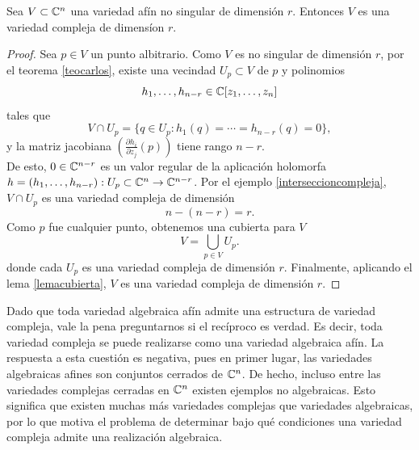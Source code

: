 \begin{corollary}\label{analiticoafin}
	Sea $V\subset \mathbb{C}^n$ una variedad afín no singular de dimensión $r$. Entonces $V$ es una variedad compleja de dimensíon $r$.
\end{corollary}
\begin{proof}
	Sea $p\in V$ un punto albitrario. Como $V$ es no singular de dimensión $r$, por el teorema \ref{teocarlos}, existe una vecindad $U_p\subset V$ de $p$ y polinomios 
	\begin{equation*}
		h_1,\dots,h_{n-r}\in\mathbb{C}[z_1,\dots,z_n]
	\end{equation*}
	tales que
	\begin{equation*}
		V\cap U_p=\{q\in U_p:h_1(q)=\cdots=h_{n-r}(q)=0\},
	\end{equation*}
	y la matriz jacobiana $(\frac{\partial h_i}{\partial z_j}(p))$ tiene rango $n-r$.\\
	De esto, $0\in \mathbb{C}^{n-r}$ es un valor regular de la aplicación holomorfa $h=(h_1,\dots,h_{n-r}):U_p\subset\mathbb{C}^n\to\mathbb{C}^{n-r}$. Por el ejemplo \ref{interseccioncompleja}, $V\cap U_p$ es una variedad compleja de dimensión
	\begin{equation*}
		n-(n-r)=r.
	\end{equation*}
	Como $p$ fue cualquier punto, obtenemos una cubierta para $V$
	\begin{equation*}
		V=\bigcup_{p\in V}U_p.
	\end{equation*} 
	donde cada $U_p$ es una variedad compleja de dimensión $r$. Finalmente, aplicando el lema \ref{lemacubierta}, $V$ es una variedad compleja de dimensión $r$.
\end{proof}

Dado que toda variedad algebraica afín admite una estructura de variedad compleja, vale la pena preguntarnos si el recíproco es verdad. Es decir, toda variedad compleja se puede realizarse como una variedad algebraica afín. La respuesta a esta cuestión es negativa, pues en primer lugar, las variedades algebraicas afines son conjuntos cerrados de $\mathbb{C}^n$. De hecho, incluso entre las variedades complejas cerradas en $\mathbb{C}^n$ existen ejemplos no algebraicas. Esto significa que existen muchas más variedades complejas que variedades algebraicas, por lo que motiva el problema de determinar bajo qué condiciones una variedad compleja admite una realización algebraica.

